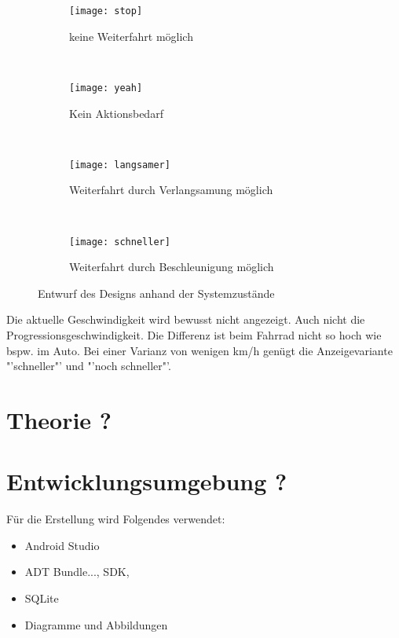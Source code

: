 \begin{figure}[H]
        \centering
           \begin{subfigure}[t]{0.23\textwidth}
                \texttt{[image: stop]}
                \caption[Systemzustand a]{keine Weiterfahrt möglich}
                \label{fig:stop}
        \end{subfigure}
           ~ 
              \begin{subfigure}[t]{0.23\textwidth}
                \texttt{[image: yeah]}
                \caption[Systemzustand b]{Kein Aktionsbedarf}
                \label{fig:yeah}
        \end{subfigure}
           ~
        \begin{subfigure}[t]{0.23\textwidth}
                \texttt{[image: langsamer]}
                \caption[Systemzustand c]{Weiterfahrt durch Verlangsamung  möglich}
                \label{fig:langsamer}
        \end{subfigure}
        ~
        \begin{subfigure}[t]{0.23\textwidth}
                \texttt{[image: schneller]}
                \caption[Systemzustand d]{Weiterfahrt durch Beschleunigung möglich}
                \label{fig:schneller}
        \end{subfigure}     
        \caption[Systemzustände im Ampelbereich]{Entwurf des Designs anhand der Systemzustände}
        \label{fig:mockup}
\end{figure} 
Die aktuelle Geschwindigkeit wird bewusst nicht angezeigt. Auch nicht die Progressionsgeschwindigkeit. Die Differenz ist beim Fahrrad nicht so hoch wie bspw. im Auto. Bei einer Varianz von wenigen km/h genügt die Anzeigevariante "'schneller"' und "'noch schneller"'.
\section{Theorie ?}
\section{Entwicklungsumgebung ?}
Für die Erstellung wird Folgendes verwendet:
\begin{itemize}
	\item Android Studio
	\item ADT Bundle..., SDK, 
	\item SQLite
	\item Diagramme und Abbildungen
\end{itemize}
